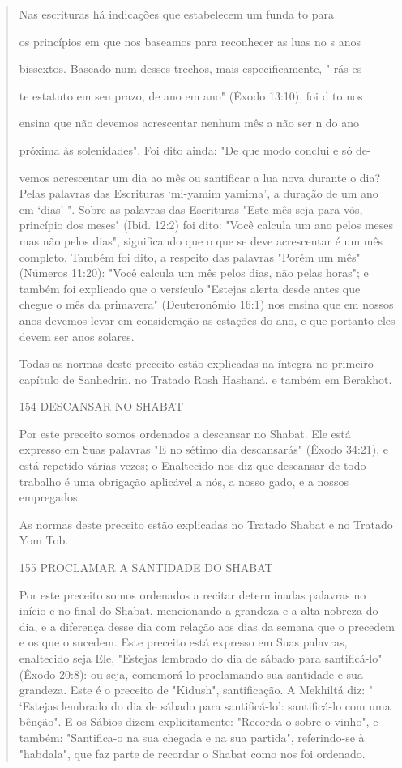 \begin{quote}
Nas escrituras há indicações que estabelecem um funda to para

os princípios em que nos baseamos para reconhecer as luas no s anos

bissextos. Baseado num desses trechos, mais especificamente, " rás es-

te estatuto em seu prazo, de ano em ano" (Êxodo 13:10), foi d to nos

ensina que não devemos acrescentar nenhum mês a não ser n do ano

próxima às solenidades". Foi dito ainda: "De que modo conclui e só de-

vemos acrescentar um dia ao mês ou santificar a lua nova durante o dia?
Pelas palavras das Escrituras `mi-yamim yamima', a duração de um ano em
`dias' ". Sobre as palavras das Escrituras "Este mês seja para vós,
princípio dos meses" (Ibid. 12:2) foi dito: "Você calcula um ano pelos
meses mas não pelos dias", significando que o que se deve acrescentar é
um mês completo. Também foi dito, a respeito das palavras "Porém um mês"
(Números 11:20): "Você calcula um mês pelos dias, não pelas horas"; e
também foi explicado que o versículo "Estejas alerta desde antes que
chegue o mês da primavera" (Deuteronômio 16:1) nos ensina que em nossos
anos devemos levar em consideração as esta­ções do ano, e que portanto
eles devem ser anos solares.

Todas as normas deste preceito estão explicadas na íntegra no pri­meiro
capítulo de Sanhedrin, no Tratado Rosh Hashaná, e também em Berakhot.

154 DESCANSAR NO SHABAT

Por este preceito somos ordenados a descansar no Shabat. Ele está
expresso em Suas palavras "E no sétimo dia descansarás" (Êxodo 34:21), e
está repetido várias vezes; o Enaltecido nos diz que descansar de todo
trabalho é uma obrigação aplicável a nós, a nosso gado, e a nossos
empregados.

As normas deste preceito estão explicadas no Tratado Shabat e no Tratado
Yom Tob.

155 PROCLAMAR A SANTIDADE DO SHABAT

Por este preceito somos ordenados a recitar determinadas palavras no
início e no final do Shabat, mencionando a grandeza e a alta nobreza do
dia, e a diferença desse dia com relação aos dias da semana que o
precedem e os que o sucedem. Este preceito está expresso em Suas
palavras, enaltecido seja Ele, "Estejas lembrado do dia de sábado para
santificá-lo" (Êxodo 20:8): ou seja, comemorá-lo proclamando sua
santidade e sua grandeza. Este é o pre­ceito de "Kidush", santificação.
A Mekhiltá diz: " `Estejas lembrado do dia de sábado para santificá-lo':
santificá-lo com uma bênção". E os Sábios dizem ex­plicitamente:
"Recorda-o sobre o vinho", e também: "Santifica-o na sua chega­da e na
sua partida", referindo-se à "habdala", que faz parte de recordar o
Sha­bat como nos foi ordenado.
\end{quote}

